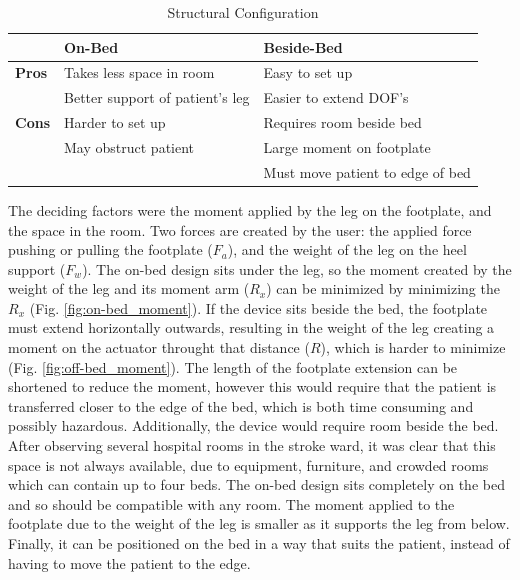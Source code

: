 \documentclass[12pt]{report}
\begin{document}
		
	\begin{table}[] \label{tab:config}
	\centering
	\caption{Structural Configuration }	
	\begin{tabular}{l|l|l}
		\hline
		& \textbf{On-Bed} & \textbf{Beside-Bed}  \\ \hline
		\textbf{Pros} & Takes less space in room  & Easy to set up  \\ 
		 & Better support of patient's leg  & Easier to extend DOF's \\ \hline
		 \textbf{Cons} & Harder to set up  & Requires room beside bed \\ 
		 & May obstruct patient  & Large moment on footplate \\ 
		 & & Must move patient to edge of bed \\ \hline

		\end{tabular}
	\label{tab:structure}
	\end{table}
		


	The deciding factors were the moment applied by the leg on the footplate, and the space in the room. Two forces are created by the user: the applied force pushing or pulling the footplate ($F_a$), and the weight of the leg on the heel support ($F_w$). The on-bed design sits under the leg, so the moment created by the weight of the leg and its moment arm ($R_x$) can be minimized by minimizing the $R_x$ (Fig. \ref{fig:on-bed_moment}). If the device sits beside the bed, the footplate must extend horizontally outwards, resulting in the weight of the leg creating a moment on the actuator throught that distance ($R$), which is harder to minimize (Fig. \ref{fig:off-bed_moment}). The length of the footplate extension can be shortened to reduce the moment, however this would require that the patient is transferred closer to the edge of the bed, which is both time consuming and possibly hazardous. Additionally, the device would require room beside the bed. After observing several hospital rooms in the stroke ward, it was clear that this space is not always available, due to equipment, furniture, and crowded rooms which can contain up to four beds. The on-bed design sits completely on the bed and so should be compatible with any room. The moment applied to the footplate due to the weight of the leg is smaller as it supports the leg from below. Finally, it can be positioned on the bed in a way that suits the patient, instead of having to move the patient to the edge. 
	
\end{document}
